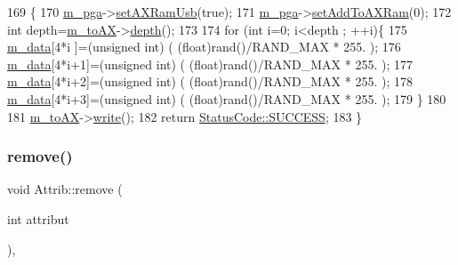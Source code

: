 \begin{DoxyCode}
169                                        \{
170   \hyperlink{classA3PE__BitFlip_ad20d7abccf27fa87b931cb77cd6b5e41}{m\_pga}->\hyperlink{classA3PE_a77ccfbd9df2fad96a9a9f1dc579a7a2d}{setAXRamUsb}(\textcolor{keyword}{true});
171   \hyperlink{classA3PE__BitFlip_ad20d7abccf27fa87b931cb77cd6b5e41}{m\_pga}->\hyperlink{classA3PE_a54fe4da570ea8833fe2c981de1085387}{setAddToAXRam}(0);
172   \textcolor{keywordtype}{int} depth=\hyperlink{classA3PE__BitFlip_a0ac416167c83d423cda4e09a892b5255}{m\_toAX}->\hyperlink{classRAM_aa36cbedb8a970a01ee07a9637553887f}{depth}();
173 
174   \textcolor{keywordflow}{for} (\textcolor{keywordtype}{int} i=0; i<depth ; ++i)\{
175     \hyperlink{classA3PE__BitFlip_a06e7c01e11710261168bb0e12e2e4ac5}{m\_data}[4*i  ]=(\textcolor{keywordtype}{unsigned} int) ( (\textcolor{keywordtype}{float})rand()/RAND\_MAX * 255. );
176     \hyperlink{classA3PE__BitFlip_a06e7c01e11710261168bb0e12e2e4ac5}{m\_data}[4*i+1]=(\textcolor{keywordtype}{unsigned} int) ( (\textcolor{keywordtype}{float})rand()/RAND\_MAX * 255. );
177     \hyperlink{classA3PE__BitFlip_a06e7c01e11710261168bb0e12e2e4ac5}{m\_data}[4*i+2]=(\textcolor{keywordtype}{unsigned} int) ( (\textcolor{keywordtype}{float})rand()/RAND\_MAX * 255. );
178     \hyperlink{classA3PE__BitFlip_a06e7c01e11710261168bb0e12e2e4ac5}{m\_data}[4*i+3]=(\textcolor{keywordtype}{unsigned} int) ( (\textcolor{keywordtype}{float})rand()/RAND\_MAX * 255. );
179   \}
180 
181   \hyperlink{classA3PE__BitFlip_a0ac416167c83d423cda4e09a892b5255}{m\_toAX}->\hyperlink{classIOobject_a9f6984bc9f0fadcf800f1be2523ac744}{write}();
182   \textcolor{keywordflow}{return} \hyperlink{classStatusCode_a6f565cbeadc76d14c72f047e5e85eb4badd0da38d3ba0d922efd1f4619bc37ad8}{StatusCode::SUCCESS};
183 \}
\end{DoxyCode}
\mbox{\label{classAttrib_a7d4ef7e32d93cb287792b87b857e79f3}} 
\subsubsection{\texorpdfstring{remove()}{remove()}}
{\footnotesize\ttfamily void Attrib\+::remove (\begin{DoxyParamCaption}\item[{int}]{attribut }\end{DoxyParamCaption})\hspace{0.3cm}{\ttfamily [inline]}, {\ttfamily [inherited]}}

